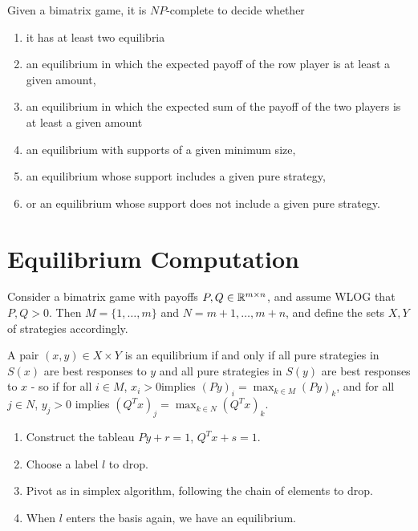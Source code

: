 \begin{thm}
  \label{sec:strat-equil-6}
  Given a bimatrix game, it is $NP$-complete to decide whether
  \begin{enumerate}
  \item it has at least two equilibria
  \item an equilibrium in which the expected payoff of the row player
    is at least a given amount,
  \item an equilibrium in which the expected sum of the payoff of the
    two players is at least a given amount
  \item an equilibrium with supports of a given minimum size,
  \item an equilibrium whose support includes a given pure strategy,
  \item or an equilibrium whose support does not include a given pure
    strategy.
  \end{enumerate}
\end{thm}

\section{Equilibrium Computation}
\label{sec:equil-comp}

\begin{defn}
  \label{sec:equil-comp-1}
  Consider a bimatrix game with payoffs $P, Q \in \mathbb{R}^{m \times n}$,
  and assume WLOG that $P, Q > 0$. Then $M = \{ 1, \dots, m \}$ and $N
  = m+1, \dots, m+n$, and define the sets $X, Y$ of strategies
  accordingly.

  A pair $(x, y) \in X \times Y$ is an equilibrium if and only if all
  pure strategies in $S(x)$ are best responses to $y$ and all pure
  strategies in $S(y)$ are best responses to $x$ - so if for all $i
  \in M$, $x_{i} > 0$implies $(Py)_{i} = \max_{k \in M}(Py)_{k}$, and
  for all $j \in N$, $y_{j} > 0$ implies $(Q^{T} x)_{j} = \max_{k \in
    N} (Q^{T}x)_{k}$.
\end{defn}

\begin{thm}
  \begin{enumerate}
  \item Construct the tableau $Py + r = 1$, $Q^{T}x + s = 1$.
  \item Choose a label $l$ to drop.
  \item Pivot as in simplex algorithm, following the chain of elements
    to drop.
  \item When $l$ enters the basis again, we have an equilibrium.
  \end{enumerate}
\end{thm}

